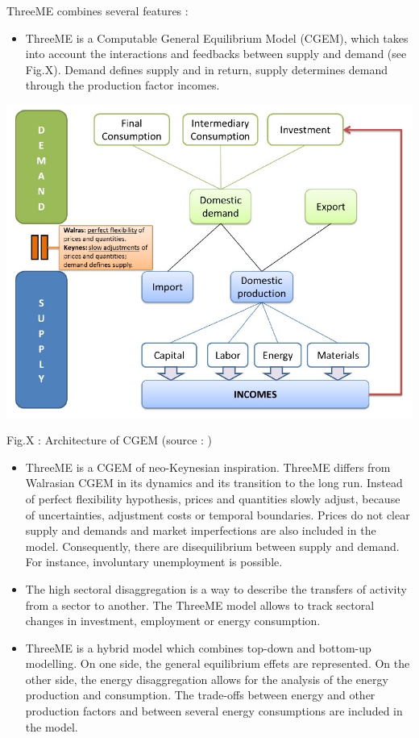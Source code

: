 \documentclass[
]{article}
\providecommand{\tightlist}{%
  \setlength{\itemsep}{0pt}\setlength{\parskip}{0pt}}
\begin{document}
ThreeME combines several features \autocites[
]{callonnec2013}{callonnec2021} :

\begin{itemize}
\tightlist
\item
  ThreeME is a Computable General Equilibrium Model (CGEM), which takes
  into account the interactions and feedbacks between supply and demand
  (see Fig.X). Demand defines supply and in return, supply determines
  demand through the production factor incomes.
\end{itemize}

\includegraphics{Images/Architecture of a CGEM.jpg}

Fig.X : Architecture of CGEM (source : \textcite{callonnec2013})

\begin{itemize}
\item
  ThreeME is a CGEM of neo-Keynesian inspiration. ThreeME differs from
  Walrasian CGEM in its dynamics and its transition to the long run.
  Instead of perfect flexibility hypothesis, prices and quantities
  slowly adjust, because of uncertainties, adjustment costs or temporal
  boundaries. Prices do not clear supply and demands and market
  imperfections are also included in the model. Consequently, there are
  disequilibrium between supply and demand. For instance, involuntary
  unemployment is possible.
\item
  The high sectoral disaggregation is a way to describe the transfers of
  activity from a sector to another. The ThreeME model allows to track
  sectoral changes in investment, employment or energy consumption.
\item
  ThreeME is a hybrid model which combines top-down and bottom-up
  modelling. On one side, the general equilibrium effets are
  represented. On the other side, the energy disaggregation allows for
  the analysis of the energy production and consumption. The trade-offs
  between energy and other production factors and between several energy
  consumptions are included in the model.
\end{itemize}
\end{document}
